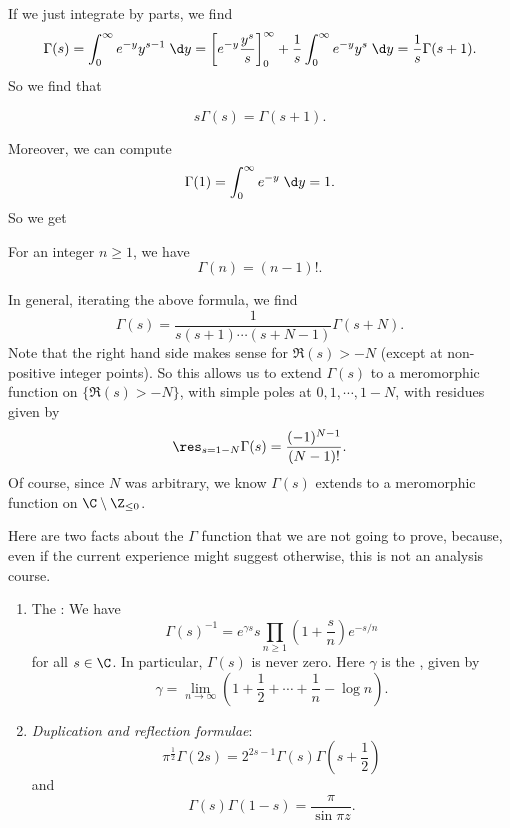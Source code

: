 \documentclass[a4paper]{article}
\begin{document}
If we just integrate by parts, we find
\[
  \Gamma(s) = \int_0^\infty e^{-y} y^{s - 1}\;\d y = \left[e^{-y} \frac{y^s}{s} \right]_0^\infty + \frac{1}{s}\int_0^\infty e^{-y} y^s \;\d y = \frac{1}{s}\Gamma(s + 1).
\]
So we find that
\begin{prop}
  \[
    s \Gamma(s) = \Gamma(s + 1).
  \]
\end{prop}
Moreover, we can compute
\[
  \Gamma(1) = \int_0^\infty e^{-y}\;\d y = 1.
\]
So we get
\begin{prop}
  For an integer $n \geq 1$, we have
  \[
    \Gamma(n) = (n - 1)!.
  \]
\end{prop}
In general, iterating the above formula, we find
\[
  \Gamma(s) = \frac{1}{s (s + 1) \cdots (s + N - 1)} \Gamma(s + N).
\]
Note that the right hand side makes sense for $\Re(s) > -N$ (except at non-positive integer points). So this allows us to extend $\Gamma(s)$ to a meromorphic function on $\{\Re(s) > -N\}$, with simple poles at $0, 1, \cdots, 1 - N$, with residues given by
\[
  \res_{s = 1 - N} \Gamma(s) = \frac{(-1)^{N - 1}}{(N - 1)!}.
\]
Of course, since $N$ was arbitrary, we know $\Gamma(s)$ extends to a meromorphic function on $\C \setminus \Z_{\leq 0}$.

Here are two facts about the $\Gamma$ function that we are not going to prove, because, even if the current experience might suggest otherwise, this is not an analysis course.
\begin{prop}\leavevmode
  \begin{enumerate}
    \item The : We have
      \[
        \Gamma(s)^{-1} = e^{\gamma s} s \prod_{n \geq 1} \left(1 + \frac{s}{n}\right) e^{-s/n}
      \]
      for all $s \in \C$. In particular, $\Gamma(s)$ is never zero. Here $\gamma$ is the , given by
      \[
        \gamma = \lim_{n \to \infty}\left(1 + \frac{1}{2} + \cdots + \frac{1}{n} - \log n\right).
      \]
    \item \emph{Duplication and reflection formulae}:
      \[
        \pi^{\frac{1}{2}} \Gamma(2s) = 2^{2s - 1} \Gamma(s) \Gamma\left(s + \frac{1}{2}\right)
      \]
      and
      \[
        \Gamma(s) \Gamma(1 - s) = \frac{\pi}{\sin \pi z}.
      \]
  \end{enumerate}
\end{prop}
\end{document}
